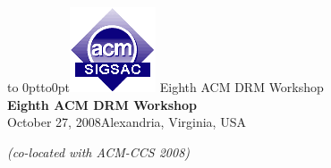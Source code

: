 \documentclass{article}
\begin{document}
\begin{center}
\vbox to 0pt{\hbox to0pt{\hskip10pt\includegraphics[width=.12\hsize]{sigsac.png}\hss}\vss}
  \textcolor[rgb]{.5,.5,.5}{\Huge Eighth ACM DRM Workshop}\\[-2mm]
  {\LARGE\bfseries \textcolor[rgb]{0,.08,.4}{Eighth ACM DRM Workshop~~}}\\[2mm]
  October 27, 2008\qquad{\tiny$^\bullet$}\qquad Alexandria, Virginia, USA
\end{center}
\begin{flushright}
  \textit{(co-located with ACM-CCS 2008)}
\end{flushright}\par\smallskip
\end{document}
